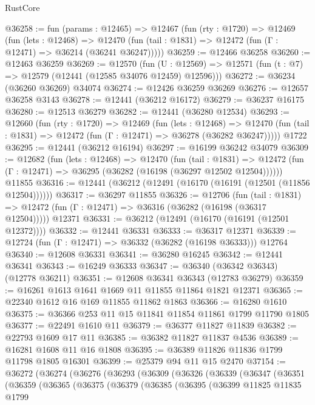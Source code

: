 \begin{lexlean}{RustCore}
\begin{coremodule}
@36258 := fun (params : @12465) =>
  @12467
    (fun (rty : @1720) =>
    @12469
      (fun (lets : @12468) =>
      @12470 (fun (tail : @1831) => @12472 (fun (Γ : @12471) => @36214 (@36241 @36247)))))
@36259 := @12466 @36258
@36260 := @12463 @36259
@36269 := @12570
    (fun (U : @12569) => @12571 (fun (t : @7) => @12579 (@12441 (@12585 @34076 @12459) @12596)))
@36272 := @36234 (@36260 @36269) @34074
@36274 := @12426 @36259 @36269
@36276 := @12657 @36258 @3143
@36278 := @12441 (@36212 @16172)
@36279 := @36237 @16175
@36280 := @12513 @36279
@36282 := @12441 (@36280 @12534)
@36293 := @12660
    (fun (rty : @1720) =>
    @12469
      (fun (lets : @12468) =>
      @12470 (fun (tail : @1831) => @12472 (fun (Γ : @12471) => @36278 (@36282 @36247)))))
    @1722
@36295 := @12441 (@36212 @16194)
@36297 := @16199 @36242 @34079
@36309 := @12682
    (fun (lets : @12468) =>
    @12470
      (fun (tail : @1831) =>
      @12472 (fun (Γ : @12471) => @36295 (@36282 (@16198 (@36297 @12502 @12504))))))
    @11855
@36316 := @12441 (@36212 (@12491 (@16170 (@16191 (@12501 (@11856 @12504))))))
@36317 := @36297 @11855
@36326 := @12706
    (fun (tail : @1831) => @12472 (fun (Γ : @12471) => @36316 (@36282 (@16198 (@36317 @12504)))))
    @12371
@36331 := @36212 (@12491 (@16170 (@16191 (@12501 @12372))))
@36332 := @12441 @36331
@36333 := @36317 @12371
@36339 := @12724 (fun (Γ : @12471) => @36332 (@36282 (@16198 @36333))) @12764
@36340 := @12608 @36331
@36341 := @36280 @16245
@36342 := @12441 @36341
@36343 := @16249 @36333
@36347 := @36340 (@36342 @36343) (@12778 @36211)
@36351 := @12608 @36341 @36343 (@12783 @36279)
@36359 := @16261 @1613 @1641 @1669 @11 @11855 @11864 @1821 @12371
@36365 := @22340 @1612 @16 @169 @11855 @11862 @1863
@36366 := @16280 @1610
@36375 := @36366 @253 @11 @15 @11841 @11854 @11861 @1799 @11790 @1805
@36377 := @22491 @1610 @11
@36379 := @36377 @11827 @11839
@36382 := @22793 @1609 @17 @11
@36385 := @36382 @11827 @11837 @4536
@36389 := @16281 @1608 @11 @16 @1808
@36395 := @36389 @11826 @11836 @1799 @11798 @1805 @16301
@36399 := @25379 @94 @11 @15 @2470
@37154 := @36272
    (@36274
      (@36276
        (@36293
          (@36309
            (@36326
              (@36339
                (@36347
                  (@36351
                    (@36359
                      (@36365
                        (@36375
                          (@36379
                            (@36385
                              (@36395
                                (@36399
                                  @11825
                                  @11835
                                  @1799

\end{coremodule}
\end{lexlean}
